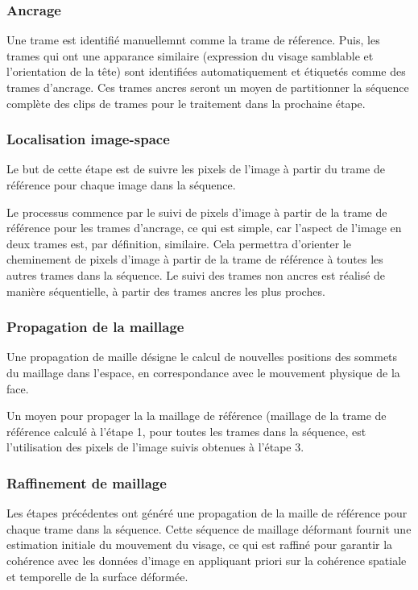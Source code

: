 \documentclass[a4paper,12pt]{article}
\begin{document}
\subsubsection*{Ancrage}
Une trame est identifié manuellemnt comme la trame de réference. Puis,
les trames qui ont une apparance similaire (expression du visage
samblable et l'orientation de la tête) sont identifiées
automatiquement et étiquetés comme des trames d'ancrage. Ces trames
ancres seront un moyen de partitionner la séquence complète des clips
de trames pour le traitement dans la prochaine étape. 

\subsubsection*{Localisation image-space}
Le but de cette étape est de suivre les pixels de l'image à partir du
trame de référence pour chaque image dans la séquence.  

Le processus commence par le suivi de pixels d'image à partir de la
trame de référence pour les trames d'ancrage, ce qui est simple, car
l'aspect de l'image en deux trames est, par définition,
similaire. Cela permettra d'orienter le cheminement de pixels d'image
à partir de la trame de référence à toutes les autres trames dans la
séquence.  
Le suivi des trames non ancres est réalisé de manière séquentielle, à
partir des trames ancres les plus proches.

\subsubsection*{Propagation de la maillage}

Une propagation de maille désigne le calcul de nouvelles positions des
sommets du maillage dans l'espace, en correspondance avec le mouvement
physique de la face.

Un moyen pour propager la la maillage de référence (maillage de la
trame de référence calculé à l'étape 1, pour toutes les trames dans
la séquence, est l'utilisation des pixels de l'image suivis obtenues à
l'étape 3.
 
\subsubsection*{Raffinement de maillage}

Les étapes précédentes ont généré une propagation de la maille de
référence pour chaque trame dans la séquence. Cette séquence de
maillage déformant fournit une estimation initiale du mouvement du
visage, ce qui est raffiné pour garantir la cohérence avec les données
d'image en appliquant priori sur la cohérence spatiale et temporelle
de la surface déformée.
\end{document}
